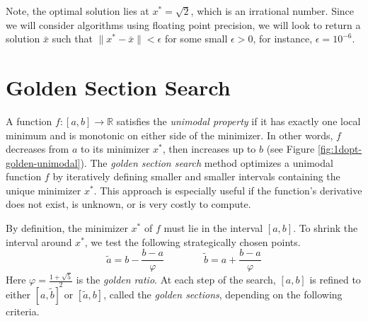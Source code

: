 Note, the optimal solution lies at $x^* = \sqrt{2}$, which is an irrational number.  Since we will consider algorithms using floating point precision, we will look to return a solution $\bar x$ such that $\|x^* - \bar x\| < \epsilon$ for some small $\epsilon > 0$, for instance, $\epsilon = 10^{-6}$.


\section{Golden Section Search} %

A function $f:[a,b]\rightarrow\mathbb{R}$ satisfies the \emph{unimodal property} if it has exactly one local minimum and is monotonic on either side of the minimizer.
In other words, $f$ decreases from $a$ to its minimizer $x^*$, then increases up to $b$ (see Figure \ref{fig:1dopt-golden-unimodal}).
The \emph{golden section search} method optimizes a unimodal function $f$ by iteratively defining smaller and smaller intervals containing the unique minimizer $x^*$.
This approach is especially useful if the function's derivative does not exist, is unknown, or is very costly to compute.

By definition, the minimizer $x^*$ of $f$ must lie in the interval $[a,b]$.
To shrink the interval around $x^*$, we test the following strategically chosen points.
\begin{equation*}
\tilde{a} = b - \frac{b - a}{\varphi}\qquad\qquad
\tilde{b} = a + \frac{b - a}{\varphi}
\end{equation*}
Here $\varphi = \frac{1 + \sqrt{5}}{2}$ is the \emph{golden ratio}.
At each step of the search, $[a,b]$ is refined to either $[a,\tilde{b}]$ or $[\tilde{a}, b]$, called the \emph{golden sections}, depending on the following criteria.

